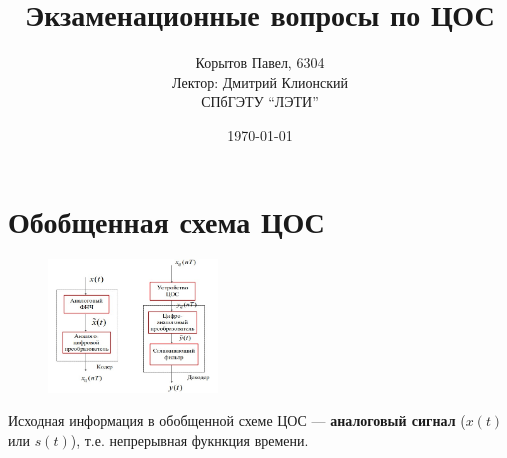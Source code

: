 \documentclass[a4paper, 14pt]{extarticle}
\title{Экзаменационные вопросы по ЦОС}
\author{Корытов Павел, 6304 \\ Лектор: Дмитрий Клионский\\ СПбГЭТУ \enquote{ЛЭТИ}}
\date{\today}
\begin{document}
{\small
\maketitle
}

\setcounter{secnumdepth}{4}
\setcounter{tocdepth}{1}
\tableofcontents{}
\section{Обобщенная схема ЦОС}
\begin{figure}[h]
    \centering
    \includegraphics[width=0.4\textwidth]{img/S001.jpg}
\end{figure}
Исходная информация в обобщенной схеме ЦОС --- \textbf{аналоговый сигнал} ($x(t)$ или $s(t)$), т.е. непрерывная фукнкция времени.
\end{document}
